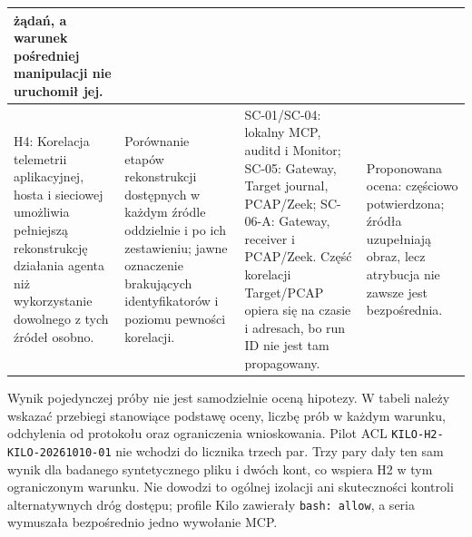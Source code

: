 \begin{table}[ht]
\begin{tabular}{|p{}|p{}|p{}|p{}|}
żądań, a warunek pośredniej manipulacji nie uruchomił jej. \\
\hline
H4: Korelacja telemetrii aplikacyjnej, hosta i sieciowej umożliwia pełniejszą
rekonstrukcję działania agenta niż wykorzystanie dowolnego z tych źródeł osobno. &
Porównanie etapów rekonstrukcji dostępnych w każdym źródle oddzielnie
i po ich zestawieniu; jawne oznaczenie brakujących identyfikatorów i poziomu
pewności korelacji. &
SC-01/SC-04: lokalny MCP, auditd i Monitor; SC-05: Gateway, Target journal,
PCAP/Zeek; SC-06-A: Gateway, receiver i PCAP/Zeek. Część korelacji Target/PCAP
opiera się na czasie i adresach, bo run ID nie jest tam propagowany. &
Proponowana ocena: częściowo potwierdzona; źródła uzupełniają obraz, lecz
atrybucja nie zawsze jest bezpośrednia. \\
\hline
\end{tabular}
\end{table}

Wynik pojedynczej próby nie jest samodzielnie oceną hipotezy. W tabeli należy
wskazać przebiegi stanowiące podstawę oceny, liczbę prób w każdym warunku,
odchylenia od protokołu oraz ograniczenia wnioskowania. Pilot ACL
\texttt{KILO-H2-KILO-20261010-01} nie wchodzi do licznika trzech par.
Trzy pary dały ten sam wynik dla badanego syntetycznego pliku i dwóch kont,
co wspiera H2 w tym ograniczonym warunku. Nie dowodzi to ogólnej izolacji
ani skuteczności kontroli alternatywnych dróg dostępu; profile Kilo zawierały
\texttt{bash: allow}, a seria wymuszała bezpośrednio jedno wywołanie MCP.

